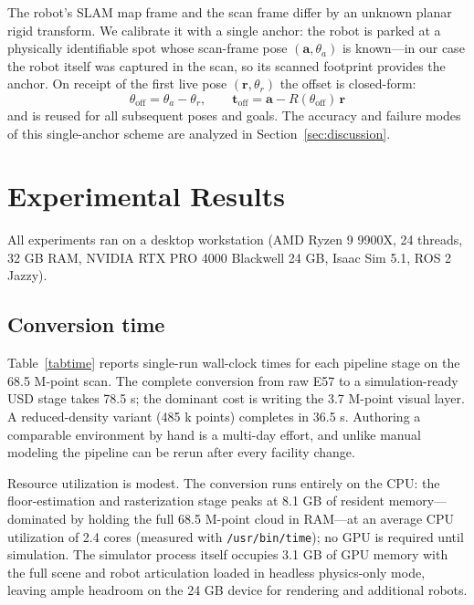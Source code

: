 \documentclass[conference]{IEEEtran}
\begin{document}
The robot's SLAM map frame and the scan frame differ by an unknown
planar rigid transform. We calibrate it with a single anchor: the
robot is parked at a physically identifiable spot whose scan-frame
pose $(\mathbf{a}, \theta_a)$ is known---in our case the robot itself
was captured in the scan, so its scanned footprint provides the
anchor. On receipt of the first live pose $(\mathbf{r}, \theta_r)$ the
offset is closed-form:
\begin{equation}
\theta_{\mathrm{off}} = \theta_a - \theta_r, \qquad
\mathbf{t}_{\mathrm{off}} = \mathbf{a} - R(\theta_{\mathrm{off}})\,\mathbf{r}
\label{eq:anchor}
\end{equation}
and is reused for all subsequent poses and goals. The accuracy and
failure modes of this single-anchor scheme are analyzed in
Section~\ref{sec:discussion}.

\section{Experimental Results}
\label{sec:results}
All experiments ran on a desktop workstation (AMD Ryzen 9 9900X,
24 threads, 32 GB RAM, NVIDIA RTX PRO 4000 Blackwell 24 GB, Isaac
Sim 5.1, ROS 2 Jazzy).

\subsection{Conversion time}
Table~\ref{tabtime} reports single-run wall-clock times for each
pipeline stage on the 68.5 M-point scan. The complete conversion from
raw E57 to a simulation-ready USD stage takes 78.5 s; the dominant
cost is writing the 3.7 M-point visual layer. A reduced-density
variant (485 k points) completes in 36.5 s. Authoring a comparable
environment by hand is a multi-day effort, and unlike manual modeling
the pipeline can be rerun after every facility change.

Resource utilization is modest. The conversion runs entirely on the
CPU: the floor-estimation and rasterization stage peaks at 8.1 GB of
resident memory---dominated by holding the full 68.5 M-point cloud in
RAM---at an average CPU utilization of 2.4 cores (measured with
\texttt{/usr/bin/time}); no GPU is required until simulation. The
simulator process itself occupies 3.1 GB of GPU memory with the full
scene and robot articulation loaded in headless physics-only mode,
leaving ample headroom on the 24 GB device for rendering and
additional robots.
\end{document}
